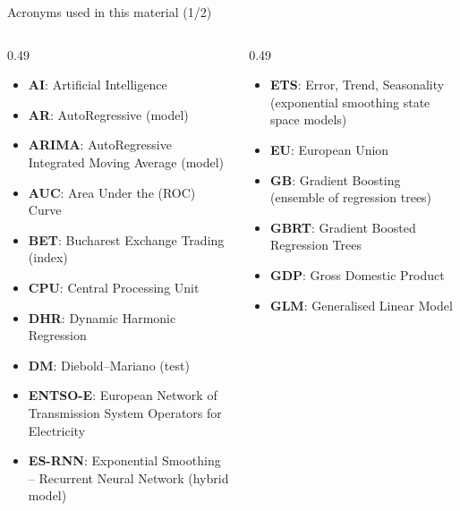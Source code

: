 
{
\begin{frame}[noframenumbering]
    \titlepage
\end{frame}
}
\begin{frame}{Acronyms used in this material (1/2)}
\begin{columns}[T]
\begin{column}{0.49\textwidth}
\begin{itemize}\setlength{\itemsep}{0pt}
    \item \textbf{AI}: Artificial Intelligence
    \item \textbf{AR}: AutoRegressive (model)
    \item \textbf{ARIMA}: AutoRegressive Integrated Moving Average (model)
    \item \textbf{AUC}: Area Under the (ROC) Curve
    \item \textbf{BET}: Bucharest Exchange Trading (index)
    \item \textbf{CPU}: Central Processing Unit
    \item \textbf{DHR}: Dynamic Harmonic Regression
    \item \textbf{DM}: Diebold–Mariano (test)
    \item \textbf{ENTSO-E}: European Network of Transmission System Operators for Electricity
    \item \textbf{ES-RNN}: Exponential Smoothing – Recurrent Neural Network (hybrid model)
\end{itemize}
\end{column}
\begin{column}{0.49\textwidth}
\begin{itemize}\setlength{\itemsep}{0pt}
    \item \textbf{ETS}: Error, Trend, Seasonality (exponential smoothing state space models)
    \item \textbf{EU}: European Union
    \item \textbf{GB}: Gradient Boosting (ensemble of regression trees)
    \item \textbf{GBRT}: Gradient Boosted Regression Trees
    \item \textbf{GDP}: Gross Domestic Product
    \item \textbf{GLM}: Generalised Linear Model

\end{itemize}
\end{column}
\end{columns}
\end{frame}
